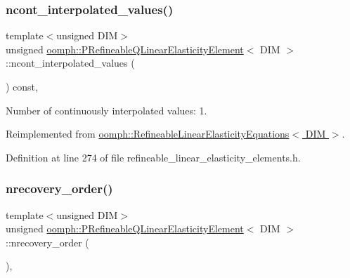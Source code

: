\subsubsection{\texorpdfstring{ncont\+\_\+interpolated\+\_\+values()}{ncont\_interpolated\_values()}}
{\footnotesize\ttfamily template$<$unsigned D\+IM$>$ \\
unsigned \hyperlink{classoomph_1_1PRefineableQLinearElasticityElement}{oomph\+::\+P\+Refineable\+Q\+Linear\+Elasticity\+Element}$<$ D\+IM $>$\+::ncont\+\_\+interpolated\+\_\+values (\begin{DoxyParamCaption}{ }\end{DoxyParamCaption}) const\hspace{0.3cm}{\ttfamily [inline]}, {\ttfamily [virtual]}}



Number of continuously interpolated values\+: 1. 



Reimplemented from \hyperlink{classoomph_1_1RefineableLinearElasticityEquations_a1a06914f28c80c10dfb485353a3ea677}{oomph\+::\+Refineable\+Linear\+Elasticity\+Equations$<$ D\+I\+M $>$}.



Definition at line 274 of file refineable\+\_\+linear\+\_\+elasticity\+\_\+elements.\+h.

\mbox{\label{classoomph_1_1PRefineableQLinearElasticityElement_afb227be6ae53f1a72a64b58b57d62ef1}} 
\subsubsection{\texorpdfstring{nrecovery\+\_\+order()}{nrecovery\_order()}}
{\footnotesize\ttfamily template$<$unsigned D\+IM$>$ \\
unsigned \hyperlink{classoomph_1_1PRefineableQLinearElasticityElement}{oomph\+::\+P\+Refineable\+Q\+Linear\+Elasticity\+Element}$<$ D\+IM $>$\+::nrecovery\+\_\+order (\begin{DoxyParamCaption}{ }\end{DoxyParamCaption})\hspace{0.3cm}{\ttfamily [inline]}, {\ttfamily [virtual]}}



